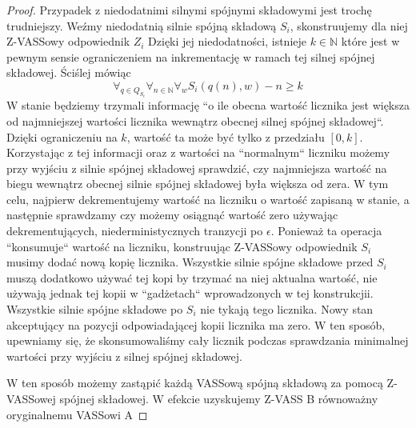 \begin{proof}
        Przypadek z niedodatnimi silnymi spójnymi składowymi jest trochę trudniejszy.
        Weźmy niedodatnią silnie spójną składową $S_i$, skonstruujemy dla niej Z-VASSowy odpowiednik $Z_i$
        Dzięki jej niedodatności, istnieje $k \in \mathbb{N}$ które jest w pewnym sensie ograniczeniem na inkrementację w ramach tej silnej spójnej składowej.
        Ściślej mówiąc
        \[\forall_{q \in Q_{S_i}} \forall_{n \in \mathbb{N}} \forall_w S_i(q(n),w) - n \geq k\]
        W stanie będziemy trzymali informację ``o ile obecna wartość licznika jest większa od najmniejszej wartości licznika wewnątrz obecnej silnej spójnej składowej``.
        Dzięki ograniczeniu na $k$, wartość ta może być tylko z przedziału $[0,k]$.
        Korzystając z tej informacji oraz z wartości na ``normalnym`` liczniku możemy przy wyjściu z silnie spójnej składowej
        sprawdzić, czy najmniejsza wartość na biegu wewnątrz obecnej silnie spójnej składowej była większa od zera.
        W tym celu, najpierw dekrementujemy wartość na liczniku o wartość zapisaną w stanie, a następnie sprawdzamy czy możemy osiągnąć
        wartość zero używając dekrementujących, niederministycznych tranzycji po $\epsilon$.
        Ponieważ ta operacja ``konsumuje`` wartość na liczniku, konstruując Z-VASSowy odpowiednik $S_i$ musimy dodać nową kopię licznika.
        Wszystkie silnie spójne składowe przed $S_i$ muszą dodatkowo używać tej kopi by trzymać na niej aktualna wartość,
        nie używają jednak tej kopii w ``gadżetach`` wprowadzonych w tej konstrukcjii.
        Wszystkie silnie spójne składowe po $S_i$ nie tykają tego licznika.
        Nowy stan akceptujący na pozycji odpowiadającej kopii licznika ma zero.
        W ten sposób, upewniamy się, że skonsumowaliśmy cały licznik podczas sprawdzania minimalnej wartości przy wyjściu z silnej spójnej składowej.


        W ten sposób możemy zastąpić każdą VASSową spójną składową za pomocą Z-VASSowej spójnej składowej.
        W efekcie uzyskujemy Z-VASS B równoważny oryginalnemu VASSowi A
    \end{proof}


